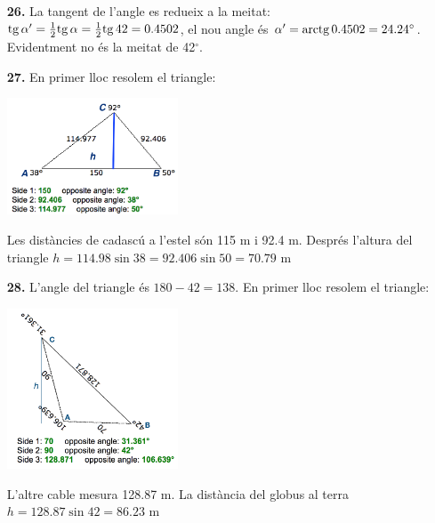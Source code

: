 \documentclass[a4paper, pdf, twoside]{book}
\begin{document}
\begin{multicols}{2}
\begin{enumerate}
\vspace{0.25cm}
\item[\fontfamily{phv}\selectfont\color{blue}\textbf{26. }] 
La tangent de l'angle es redueix a la meitat: $\mathrm{tg}\, \alpha ' = \frac {1}{2}\mathrm{tg}\, \alpha =\frac {1}{2}\mathrm{tg}\, 42=0.4502$, el nou angle és $\alpha '=\mathrm{arctg}\, 0.4502=24.24^\circ $. Evidentment no és la meitat de 42${}^\circ $.
\vspace{0.25cm}
\item[\fontfamily{phv}\selectfont\color{blue}\textbf{27. }] 
En primer lloc resolem el triangle:\par \includegraphics [width=0.4\textwidth ]{img-sol/t3-27}\par Les distàncies de cadascú a l'estel són 115 m i 92.4 m. Després l'altura del triangle $h=114.98\sin 38=92.406\sin 50=70.79$ m
\vspace{0.25cm}
\item[\fontfamily{phv}\selectfont\color{blue}\textbf{28. }] 
L'angle del triangle és $180-42=138$. En primer lloc resolem el triangle:\par \includegraphics [width=0.4\textwidth ]{img-sol/t3-28}\par L'altre cable mesura 128.87 m. La distància del globus al terra $h=128.87\sin 42=86.23$ m
 \end{enumerate}
\vspace{0.3cm}



\end{multicols}
\end{document}
